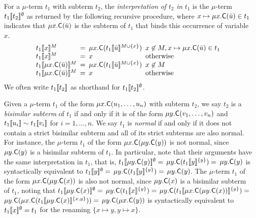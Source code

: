 For a $\mu$-term $t_1$ with subterm $t_2$, 
the \emph{interpretation of $t_2$ in $t_1$} is the $\mu$-term $t_1[\![ t_2 ]\!]^\emptyset$ as returned by the following recursive procedure,
where $x \mapsto \mu x. \textsf{C}( \bar u ) \in t_1$ indicates that $\mu x. \textsf{C}( \bar u )$ is the subterm of $t_1$ that binds this occurrence of variable $x$.
\[\begin{array}{l@{\hspace{.5em}}l@{\hspace{.5em}}l@{\hspace{.5em}}l}
t_1\interp{x}^M & = & \mu x. \const{C}( t_1\interp{ \vec u}^{M \cup \{ x \}}) & x \not\in M, x \mapsto \mu x. \const{C}( \vec u ) \in t_1  \\
t_1\interp{x}^M & = & x & \text{otherwise} \\
t_1\interp{\mu x. \const{C}( \vec u )}^M & = & \mu x. \const{C}( t_1\interp{ \vec u }^{M \cup \{ x \}} ) & x \not\in M \\
t_1\interp{\mu x. \const{C}( \vec u )}^M & = & x & \text{otherwise}
\end{array}\]
We often write $t_1[\![ t_2 ]\!]$ as shorthand for $t_1[\![ t_2 ]\!]^\emptyset$.

Given a $\mu$-term $t_1$ of the form $\mu x. \textsf{C}( u_1, \ldots, u_n )$ with subterm $t_2$,
we say $t_2$ is a \emph{bisimilar subterm} of $t_1$ if and only if it is of the form
$\mu y. \textsf{C}( v_1, \ldots, v_n )$ and $t_1[\![  u_i  ]\!] \sim t_1[\![  v_i  ]\!]$ for $i = 1,\ldots, n$.
We say $t_1$ is \emph{normal} if and only if it does not contain a strict bisimilar subterm
and all of its strict subterms are also normal.
For instance, the $\mu$-term $t_1$ of the form $\mu x. \textsf{C}( \mu y. \textsf{C}( y ) )$ is not normal, 
since $\mu y. \textsf{C}( y )$ is a bisimilar subterm of $t_1$.
In particular, note that their arguments have the same interpretation in $t_1$, 
that is,
$t_1[\![ \mu y. \textsf{C}( y ) ]\!]^\emptyset =$ 
$\mu y. \textsf{C}( t_1[\![ y ]\!]^{\{y\}} ) =$ 
$\mu y. \textsf{C}( y )$ 
is syntactically equivalent to
$t_1[\![ y ]\!]^\emptyset =$ 
$\mu y. \textsf{C}( t_1[\![ y ]\!]^{\{y\}} ) =$ 
$\mu y. \textsf{C}( y )$.
The $\mu$-term $t_1$ of the form $\mu x. \textsf{C}( \mu y. \textsf{C}( x ) )$ is also not normal, 
since $\mu y. \textsf{C}( x )$ is a bisimilar subterm of $t_1$,
noting that
$t_1[\![ \mu y. \textsf{C}( x ) ]\!]^\emptyset =$ 
$\mu y. \textsf{C}( t_1[\![ x ]\!]^{\{y\}} ) =$ 
$\mu y. \textsf{C}( t_1[\![ \mu x. \textsf{C}( \mu y. \textsf{C}( x ) )  ]\!]^{\{y\}} ) =$ 
$\mu y. \textsf{C}( \mu x. \textsf{C}( t_1[\![ \mu y. \textsf{C}( x ) ]\!]^{\{x,y\}} ) ) =$ 
$\mu y. \textsf{C}( \mu x. \textsf{C}( y ) )$
is syntactically equivalent to $t_1[\![ x ]\!]^\emptyset = t_1$ for the renaming $\{ x \mapsto y, y \mapsto x \}$.

